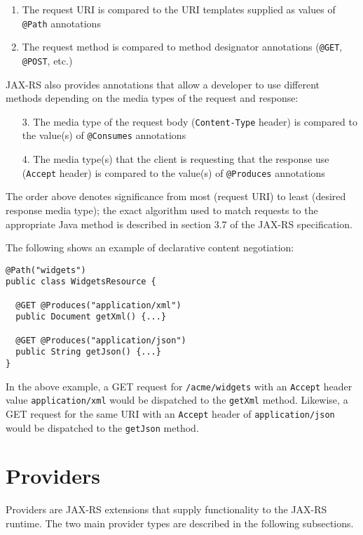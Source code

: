 \documentclass{acm_proc_article-sp}
\begin{document}
\begin{enumerate}
\item The request URI is compared to the URI templates supplied as values of \texttt{@Path} annotations
\item The request method is compared to method designator annotations (\texttt{@GET}, \texttt{@POST}, etc.)
\end{enumerate}

JAX-RS also provides annotations that allow a developer to use different methods depending on the media types of the request and response:

\begin{enumerate}
\item[3.] The media type of the request body (\texttt{Content-Type} header) is compared to the value(s) of \texttt{@Consumes} annotations
\item[4.] The media type(s) that the client is requesting that the response use (\texttt{Accept} header) is compared to the value(s) of \texttt{@Produces} annotations
\end{enumerate}

The order above denotes significance from most (request URI) to least (desired response media type); the exact algorithm used to match requests to the appropriate Java method is described in section 3.7 of the JAX-RS specification\cite{jaxrs11}.

The following shows an example of declarative content negotiation:

\begin{verbatim}
@Path("widgets")
public class WidgetsResource {

  @GET @Produces("application/xml")
  public Document getXml() {...}
  
  @GET @Produces("application/json")
  public String getJson() {...}
}
\end{verbatim}

In the above example, a GET request for \texttt{/acme/widgets} with an \texttt{Accept} header value \texttt{application/xml} would be dispatched to the \texttt{getXml} method. Likewise, a GET request for the same URI with an \texttt{Accept} header of \texttt{application/json} would be dispatched to the \texttt{getJson} method. 

\section{Providers}
\label{providers}

Providers are JAX-RS extensions that supply functionality to the JAX-RS runtime. The two main provider types are described in the following subsections.
\end{document}
